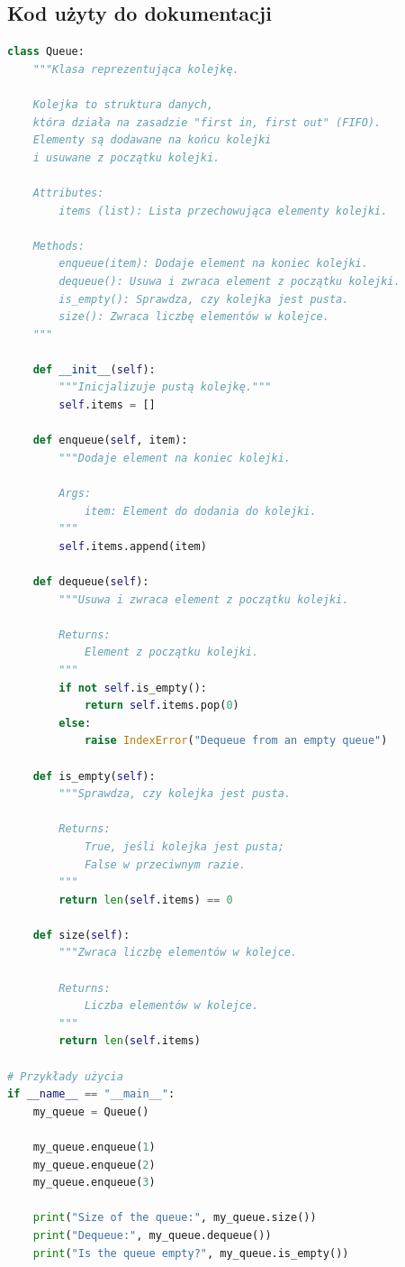 \documentclass[a4paper,12pt]{article}
\begin{document}
\subsection{Kod użyty do dokumentacji}
\begin{lstlisting}[language=Python, caption=Kod Python,captionpos=b]
    class Queue:
    """Klasa reprezentująca kolejkę.

    Kolejka to struktura danych,
    która działa na zasadzie "first in, first out" (FIFO).
    Elementy są dodawane na końcu kolejki 
    i usuwane z początku kolejki.

    Attributes:
        items (list): Lista przechowująca elementy kolejki.

    Methods:
        enqueue(item): Dodaje element na koniec kolejki.
        dequeue(): Usuwa i zwraca element z początku kolejki.
        is_empty(): Sprawdza, czy kolejka jest pusta.
        size(): Zwraca liczbę elementów w kolejce.
    """

    def __init__(self):
        """Inicjalizuje pustą kolejkę."""
        self.items = []

    def enqueue(self, item):
        """Dodaje element na koniec kolejki.

        Args:
            item: Element do dodania do kolejki.
        """
        self.items.append(item)

    def dequeue(self):
        """Usuwa i zwraca element z początku kolejki.

        Returns:
            Element z początku kolejki.
        """
        if not self.is_empty():
            return self.items.pop(0)
        else:
            raise IndexError("Dequeue from an empty queue")

    def is_empty(self):
        """Sprawdza, czy kolejka jest pusta.

        Returns:
            True, jeśli kolejka jest pusta;
            False w przeciwnym razie.
        """
        return len(self.items) == 0

    def size(self):
        """Zwraca liczbę elementów w kolejce.

        Returns:
            Liczba elementów w kolejce.
        """
        return len(self.items)

# Przykłady użycia
if __name__ == "__main__":
    my_queue = Queue()

    my_queue.enqueue(1)
    my_queue.enqueue(2)
    my_queue.enqueue(3)

    print("Size of the queue:", my_queue.size())
    print("Dequeue:", my_queue.dequeue())
    print("Is the queue empty?", my_queue.is_empty())
\end{lstlisting}
\end{document}
